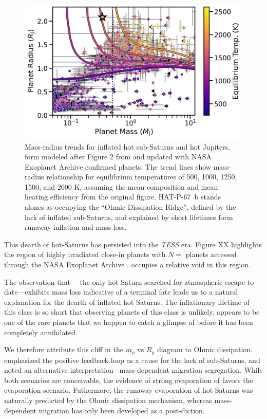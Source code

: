 \documentclass[twocolumn]{aastex631}
\newcommand{\hatpb}{\object{HAT-P-67 b}}
\begin{document}
\begin{figure}
    \includegraphics[width=\linewidth]{figures/tf2018_fig2_update2023_HAT.png}
    \caption{Mass-radius trends for inflated hot sub-Saturns and hot Jupiters, form modeled after Figure 2 from \citet{2018AJ....155..214T} and updated with NASA Exoplanet Archive confirmed planets.  The trend lines show mass-radius relationship for equilibrium temperatures of 500, 1000, 1250, 1500, and 2000 K, assuming the mean composition and mean heating efficiency from the original figure.  HAT-P-67~b stands alones as occupying the ``Ohmic Dissipation Ridge'', defined by the lack of inflated sub-Saturns, and explained by short lifetimes form runaway inflation and mass loss.}
    \label{fig:murrayClaySchematic}
\end{figure}

This dearth of hot-Saturns has persisted into the \emph{TESS} era.  Figure XX highlights the region of highly irradiated close-in planets with $N=$ planets accessed through the NASA Exoplanet Archive .  \hatpb occupies a relative void in this region.

The observation that \hatpb---the only hot Saturn searched for atmospheric escape to date---exhibits mass loss indicative of a terminal fate leads us to a natural explanation for the dearth of inflated hot Saturns.  The inflationary lifetime of this class is so short that observing planets of this class is unlikely.  \hatpb appears to be one of the rare planets that we happen to catch a glimpse of before it has been completely annihilated.

We therefore attribute this cliff in the $m_p$ vs $R_p$ diagram to Ohmic dissipation.  \citet{2018AJ....155..214T} emphasized the positive feedback loop as a cause for the lack of sub-Saturns, and noted an alternative interpretation-- mass-dependent migration segregation.  While both scenarios are conceivable, the evidence of strong evaporation of \hatpb favors the evaporation scenario.  Futhermore, the runaway evaporation of hot-Saturns was naturally predicted by the Ohmic dissipation mechanism, whereas mass-dependent migration has only been developed as a post-diction.
\end{document}
